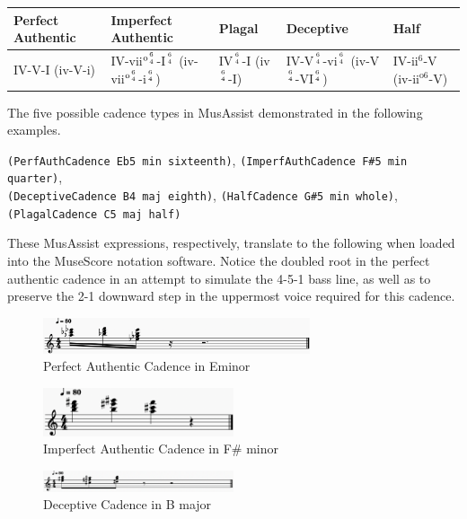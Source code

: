 \documentclass{report}
\begin{document}
\begin{table}
\begin{tabular}{|l|l|l|l|l|}
\hline
Perfect Authentic & Imperfect Authentic & Plagal & Deceptive & Half \\ \hline
IV-V-I (iv-V-i) 
& IV-vii$^{\text{o}{6 \atop 4}}$-I$^{6 \atop 4}$ (iv-vii$^{\text{o}{6 \atop 4}}$-i$^{6 \atop 4}$)
& IV$^{6 \atop 4}$-I (iv$^{6 \atop 4}$-I)        
& IV-V$^{6 \atop 4}$-vi$^{6 \atop 4}$ (iv-V$^{6 \atop 4}$-VI$^{6 \atop 4}$)
& IV-ii$^6$-V (iv-ii$^{\text{o}6}$-V)
\\ \hline
\end{tabular}
\label{table:cadences}
\end{table}

The five possible cadence types in MusAssist demonstrated in the following examples. 

\noindent\verb.(PerfAuthCadence Eb5 min sixteenth)., \verb.(ImperfAuthCadence F#5 min quarter)., \\\verb.(DeceptiveCadence B4 maj eighth)., \verb.(HalfCadence G#5 min whole)., \verb.(PlagalCadence C5 maj half).

These MusAssist expressions,  respectively, translate to the following when loaded into the MuseScore notation software. Notice the doubled root in the perfect authentic cadence in an attempt to simulate the 4-5-1 bass line, as well as to preserve the 2-1 downward step in the uppermost voice required for this cadence. 
\begin{figure}[h!]
\centering
\includegraphics[width=0.7\textwidth]{images/perfauth}
  \caption{Perfect Authentic Cadence in E\musFlat minor}
\end{figure}

\begin{figure}[h!]
\centering
\includegraphics[width=0.5\textwidth]{images/imperfauth}
  \caption{Imperfect Authentic Cadence in F\# minor}
\end{figure}

\begin{figure}[h!]
\centering
\includegraphics[width=0.5\textwidth]{images/deceptive}
  \caption{Deceptive Cadence in B major}
\end{figure}
\end{document}
